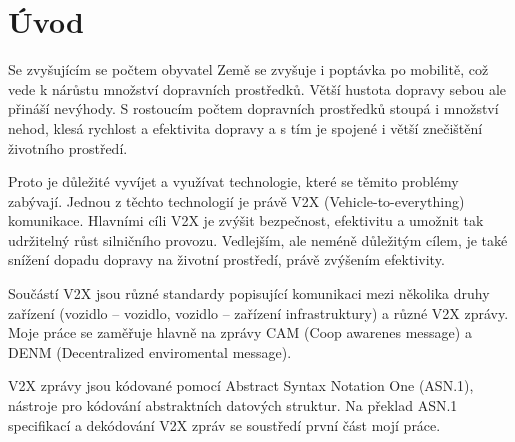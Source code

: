 \chapter{Úvod}
\setcounter{page}{1}




Se zvyšujícím se počtem obyvatel Země se zvyšuje i poptávka po mobilitě, což vede k nárůstu množství dopravních prostředků.
Větší hustota dopravy sebou ale přináší nevýhody. S rostoucím počtem dopravních prostředků stoupá i množství nehod, klesá rychlost a efektivita dopravy a s tím je spojené i větší znečištění životního prostředí.

Proto je důležité vyvíjet a využívat technologie, které se těmito problémy zabývají. Jednou z těchto technologií je právě V2X (Vehicle-to-everything) komunikace.
Hlavními cíli V2X je zvýšit bezpečnost, efektivitu
a umožnit tak udržitelný růst silničního provozu. Vedlejším, ale neméně důležitým
cílem, je také snížení dopadu dopravy na životní prostředí, právě zvýšením
efektivity.

Součástí V2X jsou různé standardy popisující komunikaci mezi několika druhy zařízení
(vozidlo – vozidlo, vozidlo – zařízení infrastruktury) a různé V2X zprávy.
Moje práce se zaměřuje hlavně na zprávy CAM (Coop awarenes message)
a DENM (Decentralized enviromental message).

V2X zprávy jsou kódované pomocí Abstract Syntax Notation One (ASN.1), nástroje pro kódování abstraktních datových struktur. Na překlad ASN.1 specifikací a dekódování V2X zpráv se soustředí první část mojí práce.

